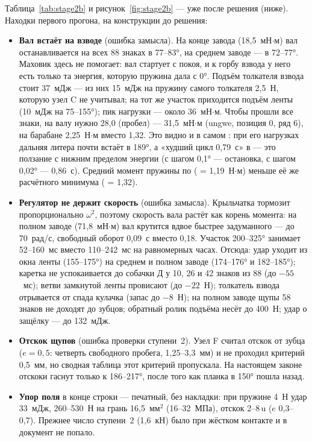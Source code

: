 Таблица~\ref{tab:stage2b} и рисунок~\ref{fig:stage2b} — уже после решения (ниже). Находки первого прогона, на конструкции до решения:
\begin{itemize}
  \item \textbf{Вал встаёт на взводе} (ошибка замысла). На конце завода (18,5~мН$\cdot$м) вал останавливается на всех 88 знаках в 77--83°, на среднем заводе — в 72--77°. Маховик здесь не помогает: вал стартует с покоя, и к горбу взвода у него есть только та энергия, которую пружина дала с 0°. Подъём толкателя взвода стоит 37~мДж — из них 15~мДж на пружину самого толкателя 2,5~Н, которую узел C не учитывал; на тот же участок приходится подъём ленты (10~мДж на 75--155°); пик нагрузки — около 36~мН$\cdot$м. Чтобы прошли все знаки, на валу нужно 28,0 (пробел) — 31,5~мН$\cdot$м (ungwe, позиция 0, ряд 6), на барабане 2,25~Н$\cdot$м вместо 1,32. Это видно и в самом : при его нагрузках дальняя литера почти встаёт в 189°, а «худший цикл 0,79~с» в  — это ползание с нижним пределом энергии (с шагом 0,1° — остановка, с шагом 0,02° — 0,86~с). Средний момент пружины по  ( = 1,19~Н$\cdot$м) меньше её же расчётного минимума ( = 1,32).
  \item \textbf{Регулятор не держит скорость} (ошибка замысла). Крыльчатка тормозит пропорционально $\omega^2$, поэтому скорость вала растёт как корень момента: на полном заводе (71,8~мН$\cdot$м) вал крутится вдвое быстрее задуманного — до 70~рад/с, свободный оборот 0,09~с вместо 0,18. Участок 200--325° занимает 52--160~мс вместо 110--242~мс на равномерных часах. Отсюда: удар уходит из окна ленты (155--175°) на среднем и полном заводе (174--176° и 182--185°); каретка не успокаивается до собачки Д у 10, 26 и 42 знаков из 88 (до $-55$~мс); ветви замкнутой ленты провисают (до $-22$~Н); толкатель взвода отрывается от спада кулачка (запас до $-8$~Н); на полном заводе щупы 58 знаков не доходят до зубцов; обратный ролик подъёма несёт до 400~Н; удар о защёлку — до 132~мДж.
  \item \textbf{Отскок щупов} (ошибка проверки ступени~2). Узел F считал отскок от зубца ($e = 0{,}5$: четверть свободного пробега, 1,25--3,3~мм) и не проходил критерий 0,5~мм, но сводная таблица этот критерий пропускала. На настоящем законе отскоки гаснут только к 186--217°, после того как планка в 150° пошла назад.
  \item \textbf{Упор поля} в конце строки — печатный, без накладки: при пружине 4~Н удар 33~мДж, 260--530~Н на грань 16,5~мм$^2$ (16--32~МПа), отскок 2--8\,u ($e$ 0,3--0,7). Прежнее число ступени~2 (1,6~кН) было при жёстком контакте и в документ не попало.

\end{itemize}

